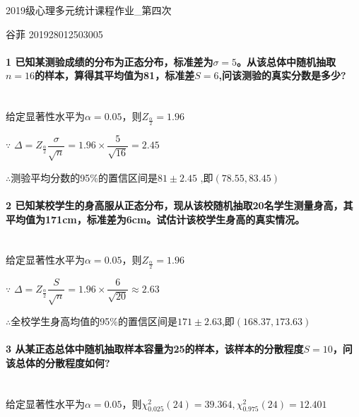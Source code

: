 \documentclass[UTF8]{ctexart}
\begin{document}
\begin{center}
	\LARGE
	2019级心理多元统计课程作业\_第四次

	\normalsize
	谷菲 201928012503005
\end{center}

\paragraph{1 已知某测验成绩的分布为正态分布，标准差为$\sigma=5$。从该总体中随机抽取$n=16$的样本，算得其平均值为81，标准差$S=6$,问该测验的真实分数是多少?}
~\\

给定显著性水平为$\alpha=0.05$，则$Z_\frac{\alpha}{2}=1.96$

$\because$
$\varDelta=Z_\frac{\alpha}{2}\dfrac{\sigma}{\sqrt{n}}=1.96\times \dfrac{5}{\sqrt{16}}=2.45$

$\therefore$测验平均分数的95\%的置信区间是$81\pm2.45$ ,即$(78.55,83.45)$


\paragraph{2 已知某校学生的身高服从正态分布，现从该校随机抽取20名学生测量身高，其平均值为171cm，标准差为6cm。试估计该校学生身高的真实情况。}
~\\

给定显著性水平为$\alpha=0.05$，则$Z_\frac{\alpha}{2}=1.96$

$\because$
$\varDelta=Z_\frac{\alpha}{2}\dfrac{S}{\sqrt{n}}=1.96\times \dfrac{6}{\sqrt{20}}\approx2.63$

$\therefore$全校学生身高均值的95\%的置信区间是$171\pm2.63$,即$(168.37,173.63)$


\paragraph{3 从某正态总体中随机抽取样本容量为25的样本，该样本的分散程度$S=10$，问该总体的分散程度如何?}
~\\

给定显著性水平为$\alpha=0.05$，则$\chi^2_{0.025}(24)=39.364,\chi^2_{0.975}(24)=12.401$
~\\
\end{document}
